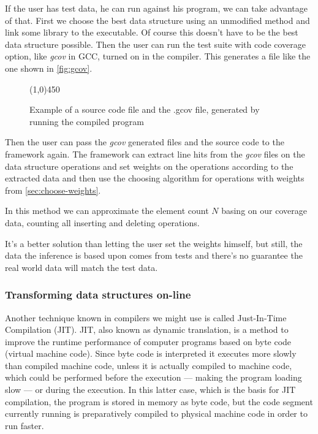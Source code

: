 \documentclass[a4paper,11pt]{article}
\begin{document}
			If the user has test data, he can run against his program, we can take advantage of that.  First
			we choose the best data structure using an unmodified method and link some library to the
			executable. Of course this doesn't have to be the best data structure possible. Then the user can run the test suite with code coverage option, like \emph{gcov} in GCC, turned on in the compiler. This
			generates a file like the one shown in \autoref{fig:gcov}.

			\begin{figure} \label{fig:gcov}
				

				\centering \line(1,0){450}

				

				\caption{Example of a source code file and the .gcov file, generated by running the
				compiled program}

				\label{fig:gcov}
			\end{figure}


			Then the user can pass the \emph{gcov} generated files and the source code to the framework
			again. The framework can extract line hits from the \emph{gcov} files on the data structure
			operations and set weights on the operations according to the extracted data and then use the
			choosing algorithm for operations with weights from \autoref{sec:choose-weights}.

            In this method we can approximate the element count $N$ basing on our coverage data, counting all inserting
            and deleting operations.

			It's a better solution than letting the user set the weights himself, but still, the data the
			inference is based upon comes from tests and there's no guarantee the real world data will
			match the test data.

		\subsubsection{Transforming data structures on-line} \label{sec:transforming-on-line}

            Another technique known in compilers we might use is called Just-In-Time Compilation (JIT). JIT, also known
            as dynamic translation, is a method to improve the runtime performance of computer programs based on byte
            code (virtual machine code). Since byte code is interpreted it executes more slowly than compiled machine
            code, unless it is actually compiled to machine code, which could be performed before the execution –-- making
            the program loading slow –-- or during the execution. In this latter case, which is the basis for JIT
            compilation, the program is stored in memory as byte code, but the code segment currently running is
            preparatively compiled to physical machine code in order to run faster.\cite{Wijit}
\end{document}
